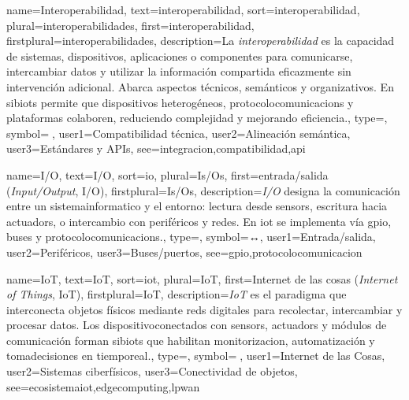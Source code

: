 	{
		name={Interoperabilidad},
		text={interoperabilidad},
		sort={interoperabilidad},
		plural={interoperabilidades},
		first={interoperabilidad},
		firstplural={interoperabilidades},
		description={La \emph{interoperabilidad} es la capacidad de \glspl{sistema}, dispositivos, aplicaciones o componentes para comunicarse, intercambiar \glspl{dato} y utilizar la informaci{\'o}n compartida eficazmente sin intervenci{\'o}n adicional. Abarca aspectos t{\'e}cnicos, sem{\'a}nticos y organizativos. En \glspl{sibiot} permite que dispositivos heterog{\'e}neos, \glspl{protocolocomunicacion} y plataformas colaboren, reduciendo complejidad y mejorando eficiencia.},
		type=\glsdefaulttype,
		symbol={🔗},
		user1={Compatibilidad t{\'e}cnica},
		user2={Alineaci{\'o}n sem{\'a}ntica},
		user3={Est{\'a}ndares y APIs},
		see={integracion,compatibilidad,api}
	}
	
	
	{
		name={I/O},
		text={I/O},
		sort={io},
		plural={Is/Os},
		first={entrada/salida (\textit{Input/Output}, I/O)},
		firstplural={Is/Os},
		description={\emph{I/O} designa la comunicaci{\'o}n entre un \gls{sistemainformatico} y el entorno: lectura desde \glspl{sensor}, escritura hacia \glspl{actuador}, o intercambio con perif{\'e}ricos y redes. En \gls{iot} se implementa v{\'i}a \gls{gpio}, buses y \glspl{protocolocomunicacion}.},
		type=\glsdefaulttype,
		symbol={↔️},
		user1={Entrada/salida},
		user2={Perif{\'e}ricos},
		user3={Buses/puertos},
		see={gpio,protocolocomunicacion}
	}
	
	{
		name={IoT},
		text={IoT},
		sort={iot},
		plural={IoT},
		first={Internet de las cosas (\textit{Internet of Things}, IoT)},
		firstplural={IoT},
		description={\emph{IoT} es el paradigma que interconecta objetos f{\'i}sicos mediante \glspl{red} digitales para recolectar, intercambiar y procesar \glspl{dato}. Los \glspl{dispositivoconectado} con \glspl{sensor}, \glspl{actuador} y m{\'o}dulos de comunicaci{\'o}n forman \glspl{sibiot} que habilitan \gls{monitorizacion}, automatizaci{\'o}n y \gls{tomadecisiones} en \gls{tiemporeal}.},
		type=\glsdefaulttype,
		symbol={📡},
		user1={Internet de las Cosas},
		user2={Sistemas ciberf{\'i}sicos},
		user3={Conectividad de objetos},
		see={ecosistemaiot,edgecomputing,lpwan}
	}
	
